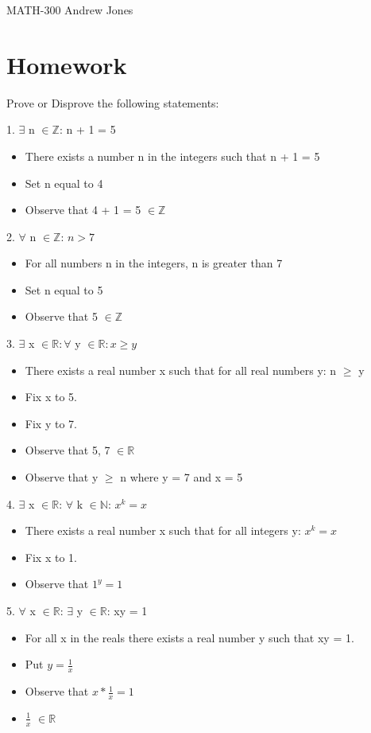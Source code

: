 \documentclass{article}
\begin{document}
  MATH-300 \hfill Andrew Jones
  \centering
  \section{Homework}
  Prove or Disprove the following statements: \newline
  \newline
  \raggedright
  1. \(\exists\) n \(\in \mathbb{Z}\): n + 1 = 5
  \begin{itemize}
    \item There exists a number n in the integers such that n + 1 = 5
    \item Set n equal to 4
    \item Observe that 4 + 1 = 5 \(\in \mathbb{Z}\)
  \end{itemize}
  2. \(\forall\) n \(\in \mathbb{Z}\): \(n > 7\)
  \begin{itemize}
    \item For all numbers n in the integers, n is greater than 7
    \item Set n equal to 5
    \item Observe that 5 \(\in \mathbb{Z}\)
  \end{itemize}
  3. \(\exists\) x \(\in \mathbb{R}: \forall\) y \(\in \mathbb{R}: x \geq y \)
  \begin{itemize}
    \item There exists a real number x such that for all real numbers y: n \(\geq\) y
    \item Fix x to 5.
    \item Fix y to 7.
    \item Observe that 5, 7 \(\in \mathbb{R}\)
    \item Observe that y \(\ge\) n where y = 7 and x = 5
  \end{itemize}
  4. \(\exists\) x \(\in \mathbb{R}\): \(\forall\) k \(\in \mathbb{N}\): \(x^k = x \) 
  \begin{itemize}
    \item There exists a real number x such that for all integers y: \(x^k = x \) 
    \item Fix x to 1.
    \item Observe that \(1^y = 1\)
  \end{itemize}
  5. \(\forall\) x \(\in \mathbb{R}\): \(\exists\) y \(\in \mathbb{R}\): xy = 1
  \begin{itemize}
    \item For all x in the reals there exists a real number y such that xy = 1.
    \item Put \(y = \frac{1}{x}\)
    \item Observe that \(x * \frac{1}{x} = 1\)
    \item \(\frac{1}{x}\) \(\in \mathbb{R}\)
  \end{itemize}
\end{document}
